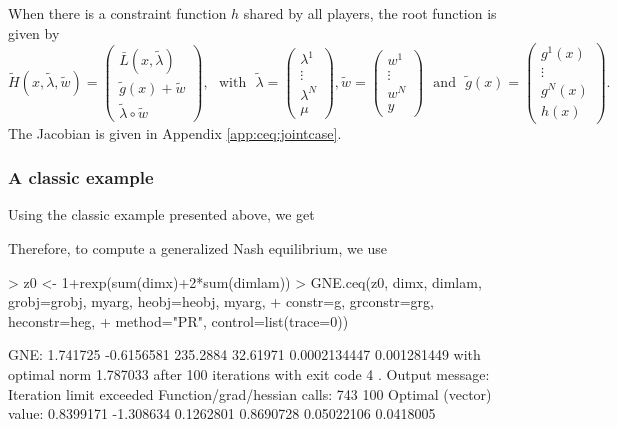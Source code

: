 \documentclass[11pt, a4paper]{article}
\newcommand{\txtm}[1]{\textrm{~~#1~~}}
\begin{document}
When there is a constraint function $h$ shared by all players, the root function is given by
$$
\widetilde H(x, \tilde \lambda, \tilde w) = 
\left( 
\begin{matrix}
\bar L(x, \tilde \lambda) \\
\tilde g(x) + \tilde w \\
\tilde \lambda \circ \tilde w 
\end{matrix}
\right) ,
\txtm{with}
\tilde \lambda = 
\left( 
\begin{matrix}
\lambda^1 \\
\vdots \\
\lambda^N \\
\mu
\end{matrix}
\right) 
,
\tilde w = 
\left( 
\begin{matrix}
w^1 \\
\vdots \\
w^N \\
y
\end{matrix}
\right) 
\txtm{and}
\tilde g(x) = 
\left( 
\begin{matrix}
g^1(x) \\
\vdots \\
g^N(x) \\
h(x)
\end{matrix}
\right) .
$$
The Jacobian is given in Appendix \ref{app:ceq:jointcase}.





\subsubsection{A classic example}
Using the classic example presented above, we get

Therefore, to compute a generalized Nash equilibrium, we use
\begin{Schunk}
\begin{Sinput}
> z0 <- 1+rexp(sum(dimx)+2*sum(dimlam))
> GNE.ceq(z0, dimx, dimlam, grobj=grobj, myarg, heobj=heobj, myarg, 
+ 	constr=g, grconstr=grg, heconstr=heg, 
+ 	method="PR", control=list(trace=0))
\end{Sinput}
\begin{Soutput}
GNE: 1.741725 -0.6156581 235.2884 32.61971 0.0002134447 0.001281449 
with optimal norm 1.787033 
after  100 iterations with exit code 4 .
Output message: Iteration limit exceeded 
Function/grad/hessian calls: 743 100 
Optimal (vector) value: 0.8399171 -1.308634 0.1262801 0.8690728 0.05022106 0.0418005 
\end{Soutput}
\end{Schunk}
\end{document}
